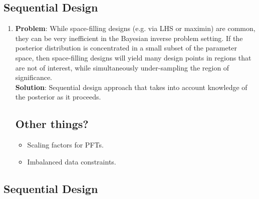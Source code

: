 \documentclass[12pt]{article}
\begin{document}
\subsection{Sequential Design}
\begin{enumerate}
\item \textbf{Problem}: While space-filling designs (e.g. via LHS or maximin) are common, they can be very inefficient in the Bayesian inverse problem setting. If the posterior distribution is concentrated in a small 
subset of the parameter space, then space-filling designs will yield many design points in regions that are not of interest, while simultaneously under-sampling the region of significance.  \\
	\textbf{Solution}: Sequential design approach that takes into account knowledge of the posterior as it proceeds. 
	
\subsection{Other things?}
\begin{itemize}
\item Scaling factors for PFTs. 
\item Imbalanced data constraints. 
\end{itemize}
	
\end{enumerate}

\subsection{Sequential Design}
\end{document}
